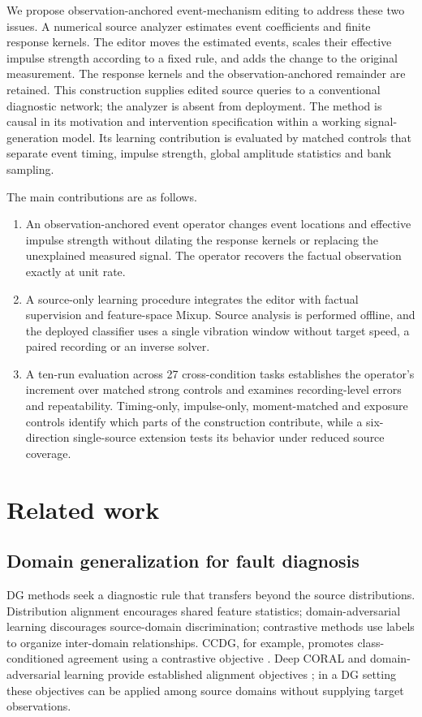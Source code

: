\documentclass[a4paper,fleqn]{cas-sc}
\begin{document}
We propose observation-anchored event-mechanism editing to address these two issues. A numerical source analyzer estimates event coefficients and finite response kernels. The editor moves the estimated events, scales their effective impulse strength according to a fixed rule, and adds the change to the original measurement. The response kernels and the observation-anchored remainder are retained. This construction supplies edited source queries to a conventional diagnostic network; the analyzer is absent from deployment. The method is causal in its motivation and intervention specification within a working signal-generation model. Its learning contribution is evaluated by matched controls that separate event timing, impulse strength, global amplitude statistics and bank sampling.

The main contributions are as follows.
\begin{enumerate}
\item An observation-anchored event operator changes event locations and effective impulse strength without dilating the response kernels or replacing the unexplained measured signal. The operator recovers the factual observation exactly at unit rate.
\item A source-only learning procedure integrates the editor with factual supervision and feature-space Mixup. Source analysis is performed offline, and the deployed classifier uses a single vibration window without target speed, a paired recording or an inverse solver.
\item A ten-run evaluation across 27 cross-condition tasks establishes the operator's increment over matched strong controls and examines recording-level errors and repeatability. Timing-only, impulse-only, moment-matched and exposure controls identify which parts of the construction contribute, while a six-direction single-source extension tests its behavior under reduced source coverage.
\end{enumerate}

\section{Related work}
\subsection{Domain generalization for fault diagnosis}
DG methods seek a diagnostic rule that transfers beyond the source distributions. Distribution alignment encourages shared feature statistics; domain-adversarial learning discourages source-domain discrimination; contrastive methods use labels to organize inter-domain relationships. CCDG, for example, promotes class-conditioned agreement using a contrastive objective \cite{ccdg}. Deep CORAL and domain-adversarial learning provide established alignment objectives \cite{coral,dann}; in a DG setting these objectives can be applied among source domains without supplying target observations.
\end{document}
